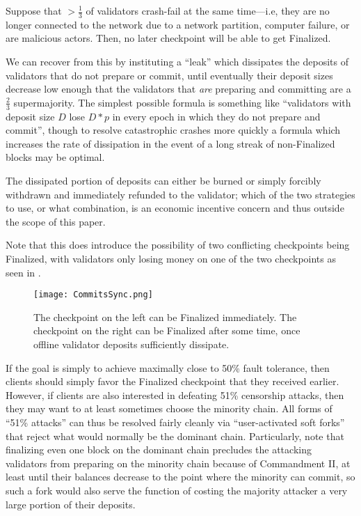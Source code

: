 \documentclass[12pt]{article}
\begin{document}
Suppose that $>\frac{1}{3}$ of validators crash-fail at the same time---i.e, they are no longer connected to the network due to a network partition, computer failure, or are malicious actors. Then, no later checkpoint will be able to get Finalized.

We can recover from this by instituting a ``leak'' which dissipates the deposits of validators that do not prepare or commit, until eventually their deposit sizes decrease low enough that the validators that \textit{are} preparing and committing are a $\frac{2}{3}$ supermajority. The simplest possible formula is something like ``validators with deposit size $D$ lose $D * p$ in every epoch in which they do not prepare and commit'', though to resolve catastrophic crashes more quickly a formula which increases the rate of dissipation in the event of a long streak of non-Finalized blocks may be optimal.

The dissipated portion of deposits can either be burned or simply forcibly withdrawn and immediately refunded to the validator; which of the two strategies to use, or what combination, is an economic incentive concern and thus outside the scope of this paper.

Note that this does introduce the possibility of two conflicting checkpoints being Finalized, with validators only losing money on one of the two checkpoints as seen in .

\begin{figure}[h!tb]
\centering
\texttt{[image: CommitsSync.png]}
\caption{The checkpoint on the left can be Finalized immediately. The checkpoint on the right can be Finalized after some time, once offline validator deposits sufficiently dissipate.}
\label{fig:commitsync}
\end{figure}

If the goal is simply to achieve maximally close to 50\% fault tolerance, then clients should simply favor the Finalized checkpoint that they received earlier. However, if clients are also interested in defeating 51\% censorship attacks, then they may want to at least sometimes choose the minority chain. All forms of ``51\% attacks'' can thus be resolved fairly cleanly via ``user-activated soft forks'' that reject what would normally be the dominant chain. Particularly, note that finalizing even one block on the dominant chain precludes the attacking validators from preparing on the minority chain because of Commandment II, at least until their balances decrease to the point where the minority can commit, so such a fork would also serve the function of costing the majority attacker a very large portion of their deposits.
\end{document}
